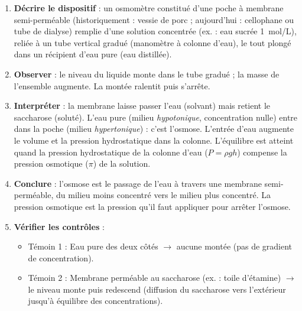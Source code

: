 \documentclass[11pt]{article}
\newcommand{\cle}[1]{{\popxbold\color{popdark}#1}}
\begin{document}
\begin{methode}
\begin{enumerate}
\item \textbf{Décrire le dispositif} : un osmomètre constitué d'une poche à membrane semi-perméable (historiquement : vessie de porc ; aujourd'hui : cellophane ou tube de dialyse) remplie d'une solution concentrée (ex. : eau sucrée \SI{1}{mol/L}), reliée à un tube vertical gradué (manomètre à colonne d'eau), le tout plongé dans un récipient d'eau pure (eau distillée).
\item \textbf{Observer} : le niveau du liquide monte dans le tube gradué ; la masse de l'ensemble augmente. La montée ralentit puis s'arrête.
\item \textbf{Interpréter} : la membrane laisse passer l'eau (solvant) mais retient le saccharose (soluté). L'eau pure (milieu \emph{hypotonique}, concentration nulle) entre dans la poche (milieu \emph{hypertonique}) : c'est l'\cle{osmose}. L'entrée d'eau augmente le volume et la pression hydrostatique dans la colonne. L'équilibre est atteint quand la \cle{pression hydrostatique} de la colonne d'eau ($P = \rho g h$) compense la \cle{pression osmotique} ($\pi$) de la solution.
\item \textbf{Conclure} : l'osmose est le passage de l'eau à travers une membrane semi-perméable, du milieu moins concentré vers le milieu plus concentré. La pression osmotique est la pression qu'il faut appliquer pour arrêter l'osmose.
\item \textbf{Vérifier les contrôles} : 
\begin{itemize}
\item Témoin 1 : Eau pure des deux côtés $\to$ aucune montée (pas de gradient de concentration).
\item Témoin 2 : Membrane perméable au saccharose (ex. : toile d'étamine) $\to$ le niveau monte puis redescend (diffusion du saccharose vers l'extérieur jusqu'à équilibre des concentrations).
\end{itemize}
\end{enumerate}
\end{methode}
\end{document}
